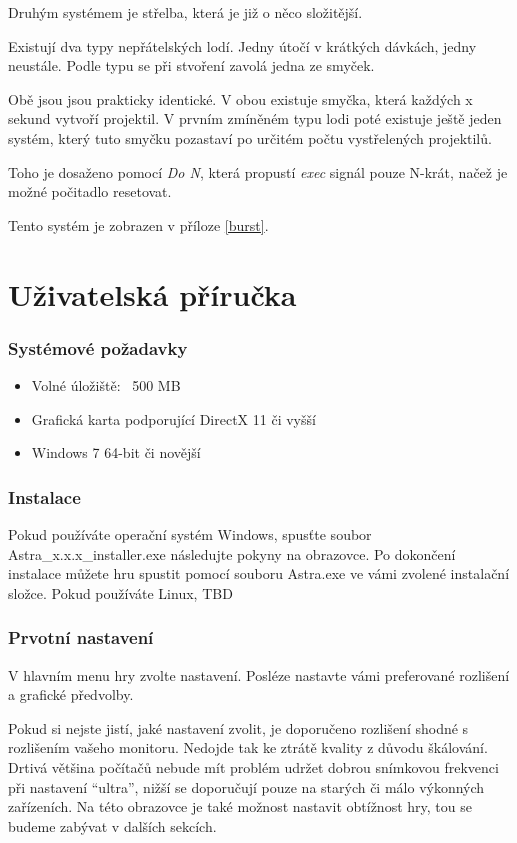 \documentclass[12pt,a4paper,hidelinks]{article}
\begin{document}
Druhým systémem je střelba, která je již o něco složitější.

Existují dva typy nepřátelských lodí. Jedny útočí v krátkých dávkách, jedny neustále. Podle typu se při stvoření zavolá jedna ze smyček.

Obě jsou jsou prakticky identické. V obou existuje smyčka, která každých x sekund vytvoří projektil. V prvním zmíněném typu lodi poté existuje ještě jeden systém, který tuto smyčku pozastaví po určitém počtu vystřelených projektilů.

Toho je dosaženo pomocí \textit{Do N}, která propustí \textit{exec} signál pouze N-krát, načež je možné počitadlo resetovat.

Tento systém je zobrazen v příloze \ref{burst}.

\clearpage
\part{Uživatelská příručka}
\section{Systémové požadavky}
\begin{itemize}
	\item Volné úložiště: ~500 MB
	\item Grafická karta podporující DirectX 11 či vyšší
	\item Windows 7 64-bit či novější
\end{itemize}
\section{Instalace}
Pokud používáte operační systém Windows, spusťte soubor Astra{\_}x.x.x{\_}installer.exe následujte pokyny na obrazovce. Po dokončení instalace můžete hru spustit pomocí souboru Astra.exe ve vámi zvolené instalační složce.
Pokud používáte Linux, TBD

\section{Prvotní nastavení}
V hlavním menu hry zvolte nastavení. Posléze nastavte vámi preferované rozlišení a grafické předvolby.

Pokud si nejste jistí, jaké nastavení zvolit, je doporučeno rozlišení shodné s rozlišením vašeho monitoru. Nedojde tak ke ztrátě kvality z důvodu škálování. Drtivá většina počítačů nebude mít problém udržet dobrou snímkovou frekvenci při nastavení \enquote{ultra}, nižší se doporučují pouze na starých či málo výkonných zařízeních.
Na této obrazovce je také možnost nastavit obtížnost hry, tou se budeme zabývat v dalších sekcích.
\end{document}
